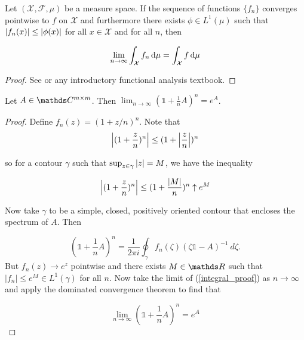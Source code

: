 \begin{theorem}
Let $(\mathcal{X}, \mathcal{F}, \mu)$ be a measure space. If the sequence of functions $\{f_n\}$ converges pointwise to $f$ on $\mathcal{X}$ and furthermore there exists $\phi \in L^1(\mu)$ such that $\abs{f_n(x)} \leq \abs{\phi(x)}$ for all $x \in \mathcal{X}$ and for all $n$, then 

\begin{align}
\lim_{n\rightarrow \infty} \int_{\mathcal{X}} f_n \,\mathrm{d} \mu = \int_{\mathcal{X}} f \,\mathrm{d} \mu
\end{align}
\end{theorem}
\begin{proof}
See \cite[\S 44]{kolmogorov2012elements} or any introductory functional analysis textbook.
\end{proof}
\begin{corollary}\label{limit-of-mat}
Let $A \in \bC^{m\times m}$. Then $\lim_{n\rightarrow \infty}(\mathds{1}+\frac{1}{n}A)^n = e^A$.
\end{corollary}
\begin{proof}
Define $f_n(z) = (1 + z/n)^n$. Note that
\begin{equation}
  \abs{(1+\frac{z}{n})^n} \leq (1 + \abs{\frac{z}{n}})^n
\end{equation}

so for a contour $\gamma$ such that $\sup_{z \in \gamma} \abs{z} = M$, we have the inequality

\begin{equation}
  \abs{(1+\frac{z}{n})^n} \leq (1 + \frac{\abs{M}}{n})^n \uparrow e^M
\end{equation}

Now take $\gamma$ to be a simple, closed, positively oriented contour that encloses the spectrum of $A$. Then

\begin{equation}\label{integral_proof}
  (\mathds{1}+\frac{1}{n}A)^n = \frac{1}{2\pi i}\oint_\gamma f_n(\zeta)(\zeta \mathds{1} - A)^{-1}\: d\zeta.
\end{equation}
But $f_n(z) \rightarrow e^z$ pointwise and there exists $M \in \bR$ such that $|f_n| \leq e^M \in L^1(\gamma)$ for all $n$. Now take the limit of (\ref{integral_proof}) as $n \rightarrow \infty$ and apply the dominated convergence theorem to find that

\begin{equation}
\lim_{n\rightarrow \infty} (\mathds{1}+\frac{1}{n}A)^n = e^A
\end{equation}
\end{proof}

